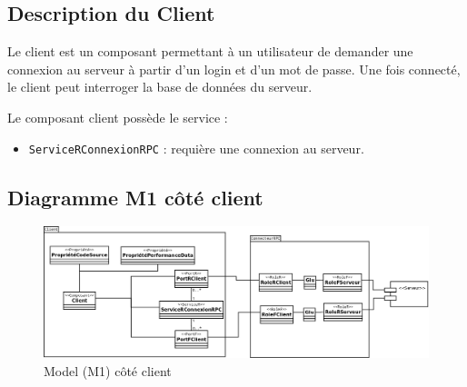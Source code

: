 \subsection{Description du Client}
Le client est un composant permettant  à un utilisateur de demander une connexion au serveur à partir d'un login et d'un mot de passe. Une fois connecté, le client peut interroger la base de données du serveur.
 
Le composant client possède le service : 
\begin{itemize}
\item 
  \verb+ServiceRConnexionRPC+ : requière une connexion au serveur.
\end{itemize}
\subsection{Diagramme M1 côté client}
\begin{figure}[htb]
  \centering
  \includegraphics[scale=0.27]{img/M11}
  \caption{Model (M1) côté client}
  \label{fig:M11}
\end{figure}

